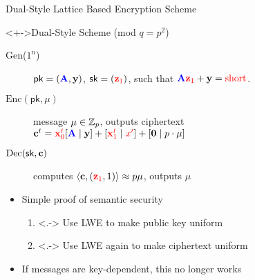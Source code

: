 \begin{frame}{Dual-Style Lattice Based Encryption Scheme}
   \begin{block}<+->{Dual-Style Scheme (mod $q=p^2$)}
     \begin{description}
     \item[Gen($1^{n}$)] $\mathsf{pk}=({\color{blue} \mathbf{A}},
       \mathbf{y})$, $\mathsf{sk}=({\color{red} \mathbf{z}_1})$,  such that 
       ${\color{blue} \mathbf{A}}{\color{red} \mathbf{z}_{1}}+\mathbf{y}={\color{red} \text{short}}$.
     \item[$\text{Enc}(\mathsf{pk}, \mu)$] message $\mu \in \mathbb{Z}_{p}$, outputs
       ciphertext \smallskip \\{\centering $\mathbf{c}^{t} =
         {\color{red} \mathbf{x}_0^{t}}[{\color{blue} \mathbf{A}} \mid \mathbf{y}] +
         [{\color{red} \mathbf{x}_1^{t}} \mid {\color{red} x'}]+[\mathbf{0} \mid p \cdot
         \mu]$\\} \smallskip
     \item[$\text{Dec}(\mathsf{sk}, \mathbf{c})$] computes
       $\langle{\ensuremath{\mathbf{c}}, (\ensuremath{{\color{red} \mathbf{z}_1}}, 1)}\rangle\approx p\mu$, outputs $\mu$
    \end{description}
   \end{block}
   \begin{itemize}
     \item<+-> Simple proof of semantic security
       \begin{enumerate}
      \item<.-> Use LWE to make public key uniform
      \item<.-> Use LWE again to make ciphertext uniform
       \end{enumerate}
      \item<+-> If messages are key-dependent, this no longer works
   \end{itemize} 
 \end{frame}

